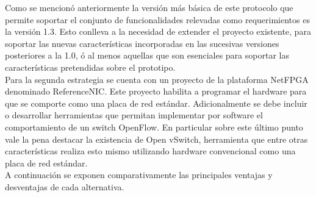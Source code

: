 Como se mencion\'o anteriormente la versi\'on m\'as b\'asica de este protocolo que permite soportar el conjunto de funcionalidades relevadas como requerimientos es la versi\'on 1.3. Esto conlleva a la necesidad de extender el proyecto existente, para soportar las nuevas caracter\'isticas incorporadas en las sucesivas versiones posteriores a la 1.0, \'o al menos aquellas que son esenciales para soportar las caracter\'isticas pretendidas sobre el prototipo.\\

Para la segunda estrategia se cuenta con un proyecto de la plataforma NetFPGA denominado ReferenceNIC. Este proyecto habilita a programar el hardware para que se comporte como una placa de red estándar. Adicionalmente se debe incluir o desarrollar herramientas que permitan implementar por software el comportamiento de un switch OpenFlow. En particular sobre este \'ultimo punto vale la pena destacar la existencia de Open vSwitch, herramienta que entre otras caracter\'isticas realiza esto mismo utilizando hardware convencional como una placa de red estándar.\\

A continuación se exponen comparativamente las principales ventajas y desventajas de cada alternativa.

